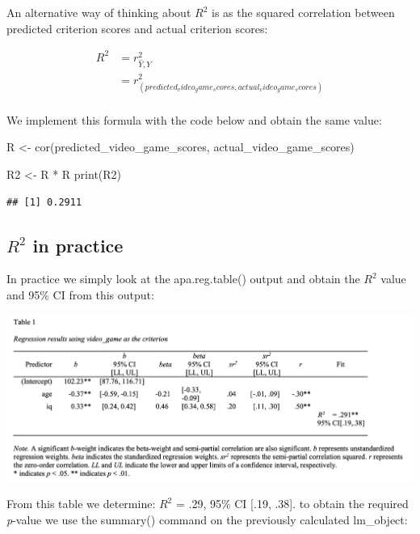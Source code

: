\documentclass[
]{krantz}
\makeatletter
\newenvironment{Shaded}{\begin{snugshade}}{\end{snugshade}}
\newcommand{\FunctionTok}[1]{\textcolor[rgb]{0,0,0}{#1}}
\newcommand{\NormalTok}[1]{#1}
\newcommand{\OtherTok}[1]{\textcolor[rgb]{0.37,0.37,0.37}{#1}}
\newcommand{\SpecialCharTok}[1]{\textcolor[rgb]{0,0,0}{#1}}
\newenvironment{kframe}{%
\medskip{}
\setlength{\fboxsep}{.8em}
 \def\at@end@of@kframe{}%
 \ifinner\ifhmode%
  \def\at@end@of@kframe{\end{minipage}}%
  \begin{minipage}{\columnwidth}%
 \fi\fi%
 \def\FrameCommand##1{\hskip\@totalleftmargin \hskip-\fboxsep
 \colorbox{shadecolor}{##1}\hskip-\fboxsep
     \hskip-\linewidth \hskip-\@totalleftmargin \hskip\columnwidth}%
 \MakeFramed {\advance\hsize-\width
   \@totalleftmargin\z@ \linewidth\hsize
   \@setminipage}}%
 {\par\unskip\endMakeFramed%
 \at@end@of@kframe}
\renewenvironment{Shaded}{\begin{kframe}}{\end{kframe}}
\makeatother
\begin{document}
An alternative way of thinking about \(R^2\) is as the squared correlation between predicted criterion scores and actual criterion scores:

\[
\begin{aligned}
R^2 &= r^2_{\hat{Y}, Y}\\
&= r^2_{(predicted_video_game_scores, actual_video_game_scores)}\\
\end{aligned}
\]

We implement this formula with the code below and obtain the same value:

\begin{Shaded}
\begin{Highlighting}[]
\NormalTok{R }\OtherTok{\textless{}{-}} \FunctionTok{cor}\NormalTok{(predicted\_video\_game\_scores, actual\_video\_game\_scores)}

\NormalTok{R2 }\OtherTok{\textless{}{-}}\NormalTok{ R }\SpecialCharTok{*}\NormalTok{ R}
\FunctionTok{print}\NormalTok{(R2)}
\end{Highlighting}
\end{Shaded}

\begin{verbatim}
## [1] 0.2911
\end{verbatim}

\hypertarget{r2-in-practice}{%
\subsection{\texorpdfstring{\(R^2\) in practice}{R\^{}2 in practice}}\label{r2-in-practice}}

In practice we simply look at the apa.reg.table() output and obtain the \(R^2\) value and 95\% CI from this output:

\includegraphics[width=0.9\linewidth]{ch_multiple_regression/images/mr_table}

From this table we determine: \(R^2\) = .29, 95\% CI {[}.19, .38{]}. to obtain the required \emph{p}-value we use the summary() command on the previously calculated lm\_object:
\end{document}
